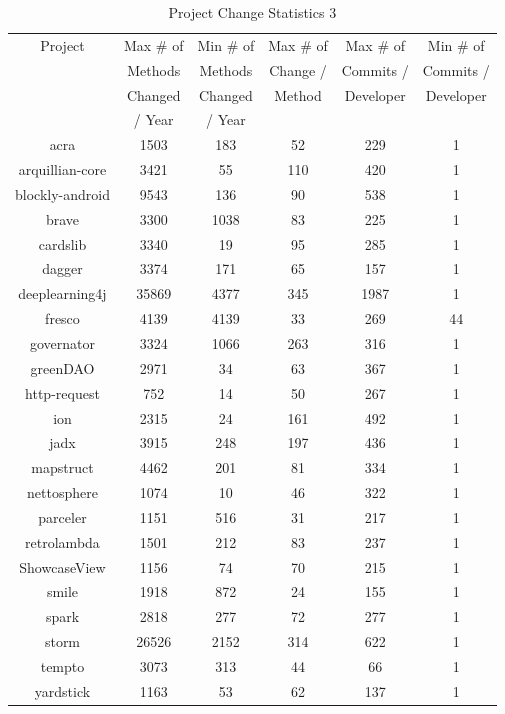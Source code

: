 \begin{table}
\begin{center}
    \begin{tabular}{|c|c|c|c|c|c|}
        \hline
        Project & Max \# of & Min \# of & Max \# of & Max \# of & Min \# of \\
         & Methods & Methods & Change / & Commits / & Commits / \\
         & Changed & Changed & Method & Developer & Developer \\
         & / Year & / Year & & & \\
        \hline
        acra & 1503 & 183 & 52 & 229 & 1 \\
        arquillian-core & 3421 & 55 & 110 & 420 & 1 \\
        blockly-android & 9543 & 136 & 90 & 538 & 1 \\
        brave & 3300 & 1038 & 83 & 225 & 1 \\
        cardslib & 3340 & 19 & 95 & 285 & 1 \\
        dagger & 3374 & 171 & 65 & 157 & 1 \\
        deeplearning4j & 35869 & 4377 & 345 & 1987 & 1 \\
        fresco & 4139 & 4139 & 33 & 269 & 44 \\
        governator & 3324 & 1066 & 263 & 316 & 1 \\
        greenDAO & 2971 & 34 & 63 & 367 & 1 \\
        http-request & 752 & 14 & 50 & 267 & 1 \\
        ion & 2315 & 24 & 161 & 492 & 1 \\
        jadx & 3915 & 248 & 197 & 436 & 1 \\
        mapstruct & 4462 & 201 & 81 & 334 & 1 \\
        nettosphere & 1074 & 10 & 46 & 322 & 1 \\
        parceler & 1151 & 516 & 31 & 217 & 1 \\
        retrolambda & 1501 & 212 & 83 & 237 & 1 \\
        ShowcaseView & 1156 & 74 & 70 & 215 & 1 \\
        smile & 1918 & 872 & 24 & 155 & 1 \\
        spark & 2818 & 277 & 72 & 277 & 1 \\
        storm & 26526 & 2152 & 314 & 622 & 1 \\
        tempto & 3073 & 313 & 44 & 66 & 1 \\
        yardstick & 1163 & 53 & 62 & 137 & 1 \\
        \hline
    \end{tabular}
\end{center}
\caption{Project Change Statistics 3}
\label{tab:project_stats_3}
\end{table}

